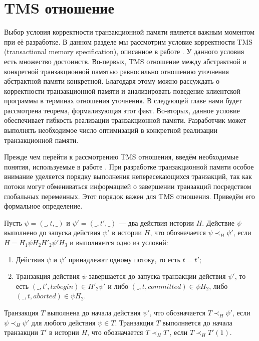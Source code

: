 \section{TMS отношение}
Выбор условия корректности транзакционной памяти является важным моментом при её разработке. В данном разделе мы рассмотрим условие корректности TMS (transactional memory specification), описанное в работе \cite{tms_article}. У данного условия есть множество достоинств. Во-первых, TMS отношение между абстрактной и конкретной транзакционной памятью равносильно отношению уточнения абстрактной памяти конкретной. Благодаря этому можно рассуждать о корректности транзакционной памяти и анализировать поведение клиентской программы в терминах отношения уточнения. В следующей главе нами будет рассмотрена теорема, формализующая этот факт. Во-вторых, данное условие обеспечивает гибкость реализации транзакционной памяти. Разработчик может выполнять необходимое число оптимизаций в конкретной реализации транзакционной памяти.

Прежде чем перейти к рассмотрению TMS отношения, введём необходимые понятия, используемые в работе \cite{tms_article}. При разработке транзакционной памяти особое внимание уделяется порядку выполнения непересекающихся транзакций, так как потоки могут обмениваться информацией о завершении транзакций посредством глобальных переменных. Этот порядок важен для TMS отношения. Приведём его формальное определение.

\begin{mydefinition}\label{order}
Пусть $\psi = (\_, t, \_)$ и $\psi' = (\_, t', \_)$ --- два действия истории $H$. Действие $\psi$ выполнено до запуска действия $\psi'$ в истории $H$, что обозначается $\psi \prec_H \psi'$, если $H = H_1\psi{H_2}H'_2\psi'{H_3}$ и выполняется одно из условий:  
\begin{enumerate}[label = (\roman*)]
\item Действия $\psi$ и $\psi'$ принадлежат одному потоку, то есть $t = t'$;
\item Транзакция действия $\psi$ завершается до запуска транзакции действия $\psi'$, то есть $(\_, t', txbegin) \in H'_2\psi'$ и либо $(\_, t, committed) \in \psi{H_2}$, либо $(\_, t, aborted) \in \psi{H_2}$. 
\end{enumerate}
Транзакция $T$ выполнена до начала действия $\psi'$, что обозначается $T \prec_H \psi'$, если $\psi \prec_H \psi'$ для любого действия $\psi \in T$. 
Транзакция $T$ выполняется до начала транзакции $T'$ в истории $H$, что обозначается $T \prec_H T'$, если $T \prec_H T'(1)$.
\end{mydefinition}

